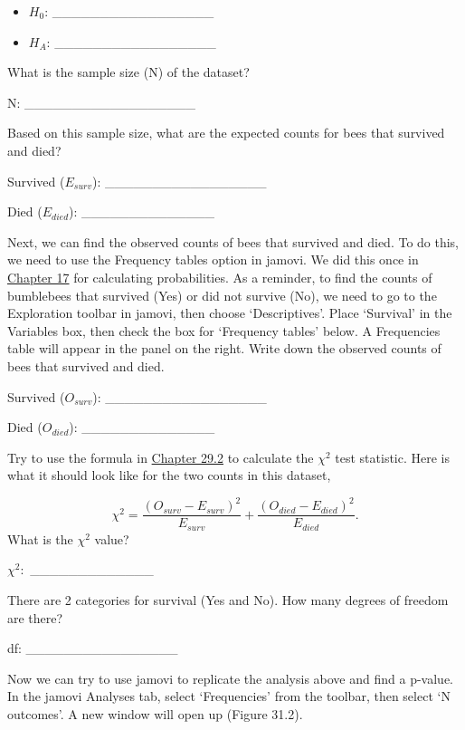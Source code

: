 \documentclass[
]{scrbook}
\begin{document}
\begin{itemize}
\item
  \(H_{0}\): \_\_\_\_\_\_\_\_\_\_\_\_\_\_\_\_\_
\item
  \(H_{A}\): \_\_\_\_\_\_\_\_\_\_\_\_\_\_\_\_\_
\end{itemize}

What is the sample size (N) of the dataset?

N: \_\_\_\_\_\_\_\_\_\_\_\_\_\_\_\_\_\_

Based on this sample size, what are the expected counts for bees that survived and died?

Survived (\(E_{surv}\)): \_\_\_\_\_\_\_\_\_\_\_\_\_\_\_\_\_

Died (\(E_{died}\)): \_\_\_\_\_\_\_\_\_\_\_\_\_\_

Next, we can find the observed counts of bees that survived and died.
To do this, we need to use the Frequency tables option in jamovi.
We did this once in \protect\hyperlink{Chapter_17}{Chapter 17} for calculating probabilities.
As a reminder, to find the counts of bumblebees that survived (Yes) or did not survive (No), we need to go to the Exploration toolbar in jamovi, then choose `Descriptives'.
Place `Survival' in the Variables box, then check the box for `Frequency tables' below.
A Frequencies table will appear in the panel on the right.
Write down the observed counts of bees that survived and died.

Survived (\(O_{surv}\)): \_\_\_\_\_\_\_\_\_\_\_\_\_\_\_\_\_

Died (\(O_{died}\)): \_\_\_\_\_\_\_\_\_\_\_\_\_\_

Try to use the formula in \protect\hyperlink{chi-squared-goodness-of-fit}{Chapter 29.2} to calculate the \(\chi^{2}\) test statistic.
Here is what it should look like for the two counts in this dataset,

\[\chi^{2} = \frac{(O_{surv} - E_{surv})^{2}}{E_{surv}} + \frac{(O_{died} - E_{died})^{2}}{E_{died}}.\]
What is the \(\chi^{2}\) value?

\(\chi^{2}:\) \_\_\_\_\_\_\_\_\_\_\_\_\_

There are 2 categories for survival (Yes and No).
How many degrees of freedom are there?

df: \_\_\_\_\_\_\_\_\_\_\_\_\_\_\_\_

Now we can try to use jamovi to replicate the analysis above and find a p-value.
In the jamovi Analyses tab, select `Frequencies' from the toolbar, then select `N outcomes'.
A new window will open up (Figure 31.2).
\end{document}
